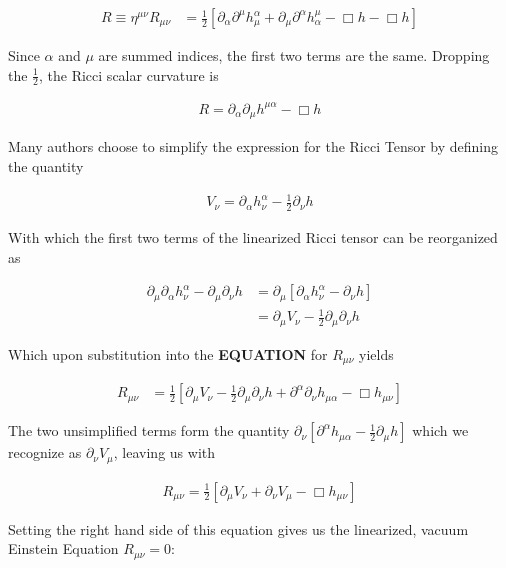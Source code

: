 \documentclass[paper=a4, fontsize=11pt]{scrartcl} %
\numberwithin{equation}{section} %
\numberwithin{figure}{section} %
\numberwithin{table}{section} %
\begin{document}
\begin{align}
R \equiv \eta^{\mu \nu}R_{\mu \nu} &= \frac{1}{2}\left[\partial_{\alpha}\partial^{\mu}h_{\mu}^{\alpha} + \partial_{\mu} \partial^{\alpha}h^{\mu}_{\alpha} - \Box h - \Box h\right]
\end{align}

Since $\alpha$ and $\mu$ are summed indices, the first two terms are the same. Dropping the $\frac{1}{2}$, the Ricci scalar curvature is 

\begin{align}
R = \partial_{\alpha}\partial_{\mu}h^{\mu \alpha} - \Box h
\end{align}

Many authors choose to simplify the expression for the Ricci Tensor by defining the quantity

\begin{align}
V_{\nu} = \partial_{\alpha}h^{\alpha}_{\nu} - \frac{1}{2}\partial_{\nu}h
\end{align}

With which the first two terms of the linearized Ricci tensor can be reorganized as

\begin{align}
\partial_{\mu}\partial_{\alpha}h_{\nu}^{\alpha} - \partial_{\mu}\partial_{\nu}h &= \partial_{\mu}\left[\partial_{\alpha}h_{\nu}^{\alpha} - \partial_{\nu}h\right] \\
&= \partial_{\mu}V_{\nu} - \frac{1}{2}\partial_{\mu}\partial_{\nu}h
\end{align}

Which upon substitution into the \textbf{EQUATION} for $R_{\mu \nu}$ yields

\begin{align}
R_{\mu \nu} &= \frac{1}{2}\left[\partial_{\mu}V_{\nu} - \frac{1}{2}\partial_{\mu}\partial_{\nu}h + \partial^{\alpha}\partial_{\nu}h_{\mu \alpha} - \Box h_{\mu \nu}\right]
\end{align}

The two unsimplified terms form the quantity $\partial_{\nu}\left[\partial^{\alpha}h_{\mu \alpha} - \frac{1}{2}\partial_{\mu}h\right]$ which we recognize as $\partial_{\nu}V_{\mu}$, leaving us with

\begin{align}
R_{\mu \nu} = \frac{1}{2}\left[\partial_{\mu}V_{\nu} + \partial_{\nu}V_{\mu} - \Box h_{\mu \nu}\right] 
\end{align}

Setting the right hand side of this equation gives us the linearized, vacuum Einstein Equation $R_{\mu \nu} = 0$:
\end{document}
